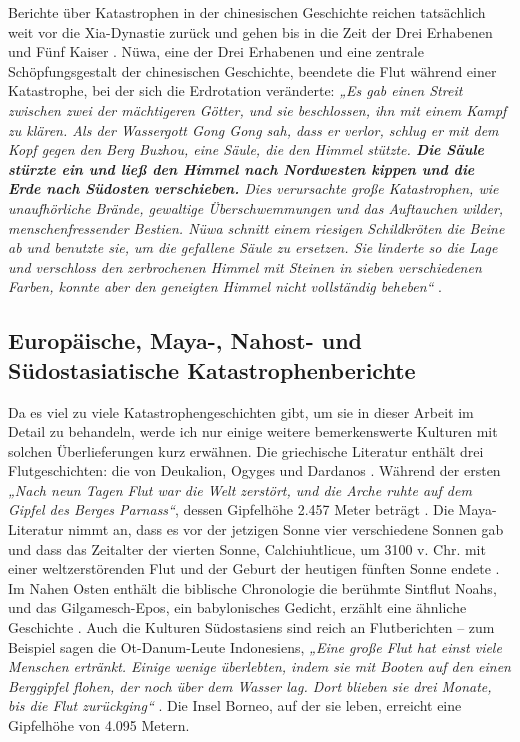 \documentclass[10pt,twocolumn,letterpaper]{article}
\begin{document}
Berichte über Katastrophen in der chinesischen Geschichte reichen tatsächlich weit vor die Xia-Dynastie zurück und gehen bis in die Zeit der Drei Erhabenen und Fünf Kaiser \cite{7}. Nüwa, eine der Drei Erhabenen und eine zentrale Schöpfungsgestalt der chinesischen Geschichte, beendete die Flut während einer Katastrophe, bei der sich die Erdrotation veränderte: \textit{„Es gab einen Streit zwischen zwei der mächtigeren Götter, und sie beschlossen, ihn mit einem Kampf zu klären. Als der Wassergott Gong Gong sah, dass er verlor, schlug er mit dem Kopf gegen den Berg Buzhou, eine Säule, die den Himmel stützte. \textbf{Die Säule stürzte ein und ließ den Himmel nach Nordwesten kippen und die Erde nach Südosten verschieben.} Dies verursachte große Katastrophen, wie unaufhörliche Brände, gewaltige Überschwemmungen und das Auftauchen wilder, menschenfressender Bestien. Nüwa schnitt einem riesigen Schildkröten die Beine ab und benutzte sie, um die gefallene Säule zu ersetzen. Sie linderte so die Lage und verschloss den zerbrochenen Himmel mit Steinen in sieben verschiedenen Farben, konnte aber den geneigten Himmel nicht vollständig beheben“} \cite{8}.

\subsection{Europäische, Maya-, Nahost- und Südostasiatische Katastrophenberichte}

Da es viel zu viele Katastrophengeschichten gibt, um sie in dieser Arbeit im Detail zu behandeln, werde ich nur einige weitere bemerkenswerte Kulturen mit solchen Überlieferungen kurz erwähnen. Die griechische Literatur enthält drei Flutgeschichten: die von Deukalion, Ogyges und Dardanos \cite{9,10}. Während der ersten \textit{„Nach neun Tagen Flut war die Welt zerstört, und die Arche ruhte auf dem Gipfel des Berges Parnass“}, dessen Gipfelhöhe 2.457 Meter beträgt \cite{11}. Die Maya-Literatur nimmt an, dass es vor der jetzigen Sonne vier verschiedene Sonnen gab und dass das Zeitalter der vierten Sonne, Calchiuhtlicue, um 3100 v. Chr. mit einer weltzerstörenden Flut und der Geburt der heutigen fünften Sonne endete \cite{12}. Im Nahen Osten enthält die biblische Chronologie die berühmte Sintflut Noahs, und das Gilgamesch-Epos, ein babylonisches Gedicht, erzählt eine ähnliche Geschichte \cite{13}. Auch die Kulturen Südostasiens sind reich an Flutberichten – zum Beispiel sagen die Ot-Danum-Leute Indonesiens, \textit{„Eine große Flut hat einst viele Menschen ertränkt. Einige wenige überlebten, indem sie mit Booten auf den einen Berggipfel flohen, der noch über dem Wasser lag. Dort blieben sie drei Monate, bis die Flut zurückging“} \cite{3}. Die Insel Borneo, auf der sie leben, erreicht eine Gipfelhöhe von 4.095 Metern.
\end{document}
